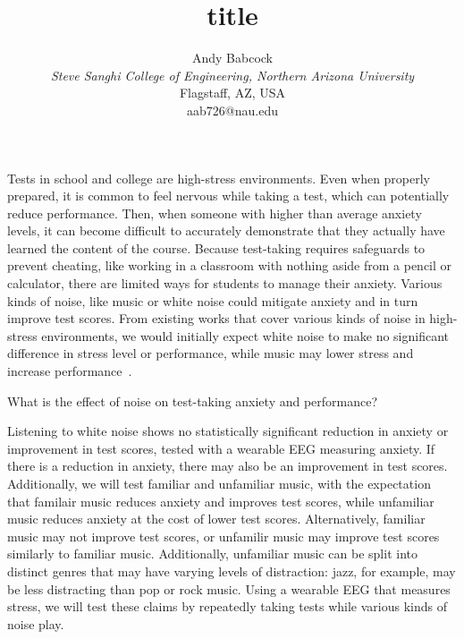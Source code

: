 \documentclass[journal]{IEEEtran}
\begin{document}
\title{title}

\author{Andy Babcock \\
    \textit{Steve Sanghi College of Engineering, Northern Arizona University} \\
    Flagstaff, AZ, USA \\
    aab726@nau.edu
}

\maketitle
Tests in school and college are high-stress environments. Even when properly prepared, it is common to feel nervous while taking a test, which can potentially reduce performance. Then, when someone with higher than average anxiety levels, it can become difficult to accurately demonstrate that they actually have learned the content of the course. Because test-taking requires safeguards to prevent cheating, like working in a classroom with nothing aside from a pencil or calculator, there are limited ways for students to manage their anxiety. Various kinds of noise, like music or white noise could mitigate anxiety and in turn improve test scores. From existing works that cover various kinds of noise in high-stress environments, we would initially expect white noise to make no significant difference in stress level or performance, while music may lower stress and increase performance~\cite{ShahrokhiShabnam2022Teow}.

What is the effect of noise on test-taking anxiety and performance?

Listening to white noise shows no statistically significant reduction in anxiety or improvement in test scores, tested with a wearable EEG measuring anxiety. If there is a reduction in anxiety, there may also be an improvement in test scores. Additionally, we will test familiar and unfamiliar music, with the expectation that familair music reduces anxiety and improves test scores, while unfamiliar music reduces anxiety at the cost of lower test scores. Alternatively, familiar music may not improve test scores, or unfamilir music may improve test scores similarly to familiar music. Additionally, unfamiliar music can be split into distinct genres that may have varying levels of distraction: jazz, for example, may be less distracting than pop or rock music. Using a wearable EEG that measures stress, we will test these claims by repeatedly taking tests while various kinds of noise play.



\end{document}
